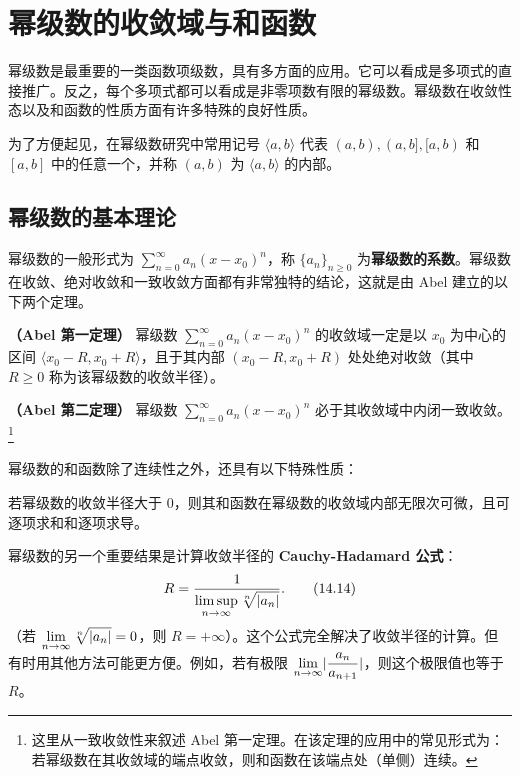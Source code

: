 \section{幂级数的收敛域与和函数}

幂级数是最重要的一类函数项级数，具有多方面的应用。它可以看成是多项式的直接推广。反之，每个多项式都可以看成是非零项数有限的幂级数。幂级数在收敛性态以及和函数的性质方面有许多特殊的良好性质。

为了方便起见，在幂级数研究中常用记号 $\langle a,b\rangle$ 代表 $(a,b),(a,b],[a,b)$ 和 $[a,b]$ 中的任意一个，并称 $(a,b)$ 为 $\langle a,b\rangle$ 的内部。

\subsection{幂级数的基本理论}

幂级数的一般形式为 $\displaystyle\sum_{n=0}^{\infty}a_n(x-x_0)^n$，称 $\{a_n\}_{n\geqslant0}$ 为\textbf{幂级数的系数}。幂级数在收敛、绝对收敛和一致收敛方面都有非常独特的结论，这就是由 Abel 建立的以下两个定理。

\begin{xproposition}[14.3.1]
\textbf{（Abel 第一定理）} 幂级数 $\displaystyle\sum_{n=0}^{\infty}a_n(x-x_0)^n$ 的收敛域一定是以 $x_0$ 为中心的区间 $\langle x_0-R,x_0+R\rangle$，且于其内部 $(x_0-R,x_0+R)$ 处处绝对收敛（其中 $R\geqslant0$ 称为该幂级数的收敛半径）。
\end{xproposition}

\begin{xproposition}[14.3.2]
\textbf{（Abel 第二定理）} 幂级数 $\displaystyle\sum_{n=0}^{\infty}a_n(x-x_0)^n$ 必于其收敛域中内闭一致收敛。\footnote{这里从一致收敛性来叙述 Abel 第一定理。在该定理的应用中的常见形式为：若幂级数在其收敛域的端点收敛，则和函数在该端点处（单侧）连续。}
\end{xproposition}

幂级数的和函数除了连续性之外，还具有以下特殊性质：

\begin{xproposition}[14.3.3]
若幂级数的收敛半径大于 $0$，则其和函数在幂级数的收敛域内部无限次可微，且可逐项求和和逐项求导。
\end{xproposition}

幂级数的另一个重要结果是计算收敛半径的 \textbf{Cauchy-Hadamard 公式}：
\begin{equation}
  R=\frac1{\displaystyle\limsup_{n\to\infty}\sqrt[n]{\lvert a_n\rvert}}.
  \tag{14.14}
  \label{eq:14.14}
\end{equation}
（若 $\displaystyle\lim_{n\to\infty}\sqrt[n]{\lvert a_n\rvert}=0$，则 $R=+\infty$）。这个公式完全解决了收敛半径的计算。但有时用其他方法可能更方便。例如，若有极限 $\displaystyle\lim_{n\to\infty}\lvert\frac{a_n}{a_{n+1}}\rvert$，则这个极限值也等于 $R$。

